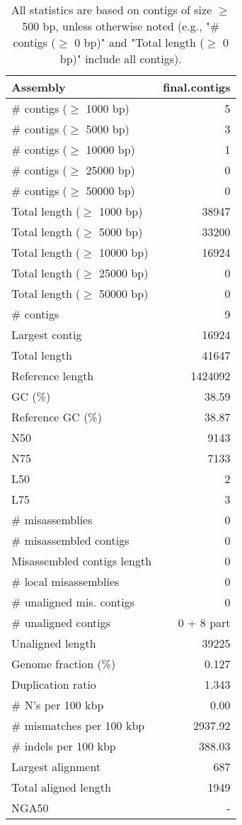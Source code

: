 \documentclass[12pt,a4paper]{article}
\begin{document}
\begin{table}[ht]
\begin{center}
\caption{All statistics are based on contigs of size $\geq$ 500 bp, unless otherwise noted (e.g., "\# contigs ($\geq$ 0 bp)" and "Total length ($\geq$ 0 bp)" include all contigs).}
\begin{tabular}{|l*{1}{|r}|}
\hline
Assembly & final.contigs \\ \hline
\# contigs ($\geq$ 1000 bp) & 5 \\ \hline
\# contigs ($\geq$ 5000 bp) & 3 \\ \hline
\# contigs ($\geq$ 10000 bp) & 1 \\ \hline
\# contigs ($\geq$ 25000 bp) & 0 \\ \hline
\# contigs ($\geq$ 50000 bp) & 0 \\ \hline
Total length ($\geq$ 1000 bp) & 38947 \\ \hline
Total length ($\geq$ 5000 bp) & 33200 \\ \hline
Total length ($\geq$ 10000 bp) & 16924 \\ \hline
Total length ($\geq$ 25000 bp) & 0 \\ \hline
Total length ($\geq$ 50000 bp) & 0 \\ \hline
\# contigs & 9 \\ \hline
Largest contig & 16924 \\ \hline
Total length & 41647 \\ \hline
Reference length & 1424092 \\ \hline
GC (\%) & 38.59 \\ \hline
Reference GC (\%) & 38.87 \\ \hline
N50 & 9143 \\ \hline
N75 & 7133 \\ \hline
L50 & 2 \\ \hline
L75 & 3 \\ \hline
\# misassemblies & 0 \\ \hline
\# misassembled contigs & 0 \\ \hline
Misassembled contigs length & 0 \\ \hline
\# local misassemblies & 0 \\ \hline
\# unaligned mis. contigs & 0 \\ \hline
\# unaligned contigs & 0 + 8 part \\ \hline
Unaligned length & 39225 \\ \hline
Genome fraction (\%) & 0.127 \\ \hline
Duplication ratio & 1.343 \\ \hline
\# N's per 100 kbp & 0.00 \\ \hline
\# mismatches per 100 kbp & 2937.92 \\ \hline
\# indels per 100 kbp & 388.03 \\ \hline
Largest alignment & 687 \\ \hline
Total aligned length & 1949 \\ \hline
NGA50 & - \\ \hline
\end{tabular}
\end{center}
\end{table}
\end{document}
